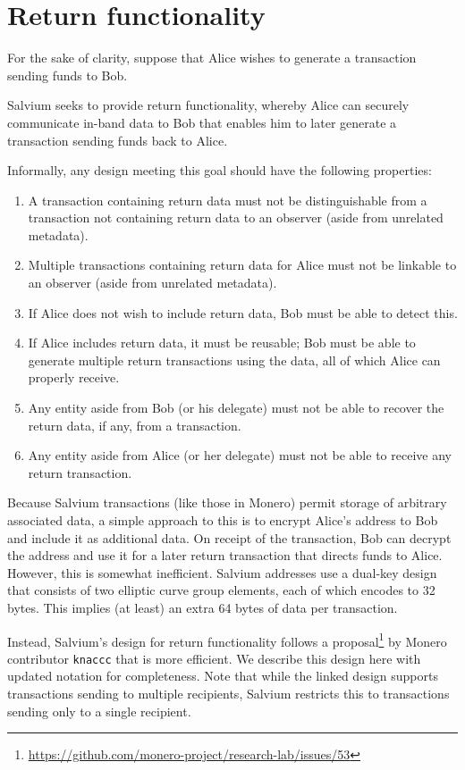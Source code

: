 \documentclass{article}
\begin{document}
\section{Return functionality}

For the sake of clarity, suppose that Alice wishes to generate a transaction sending funds to Bob.

Salvium seeks to provide return functionality, whereby Alice can securely communicate in-band data to Bob that enables him to later generate a transaction sending funds back to Alice.

Informally, any design meeting this goal should have the following properties:
\begin{enumerate}
	\item\label{req:distinguish} A transaction containing return data must not be distinguishable from a transaction not containing return data to an observer (aside from unrelated metadata).
	\item\label{req:link} Multiple transactions containing return data for Alice must not be linkable to an observer (aside from unrelated metadata). 
	\item\label{req:no} If Alice does not wish to include return data, Bob must be able to detect this.
	\item\label{req:reuse} If Alice includes return data, it must be reusable; Bob must be able to generate multiple return transactions using the data, all of which Alice can properly receive.
	\item\label{req:bob} Any entity aside from Bob (or his delegate) must not be able to recover the return data, if any, from a transaction.
	\item\label{req:alice} Any entity aside from Alice (or her delegate) must not be able to receive any return transaction.
\end{enumerate}

Because Salvium transactions (like those in Monero) permit storage of arbitrary associated data, a simple approach to this is to encrypt Alice's address to Bob and include it as additional data.
On receipt of the transaction, Bob can decrypt the address and use it for a later return transaction that directs funds to Alice.
However, this is somewhat inefficient.
Salvium addresses use a dual-key design that consists of two elliptic curve group elements, each of which encodes to 32 bytes.
This implies (at least) an extra 64 bytes of data per transaction.

Instead, Salvium's design for return functionality follows a proposal\footnote{\url{https://github.com/monero-project/research-lab/issues/53}} by Monero contributor \texttt{knaccc} that is more efficient.
We describe this design here with updated notation for completeness.
Note that while the linked design supports transactions sending to multiple recipients, Salvium restricts this to transactions sending only to a single recipient.
\end{document}
